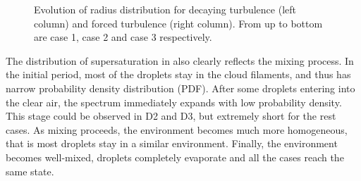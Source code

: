 \begin{figure}[H]\ContinuedFloat\centering
{}
\caption{Evolution of radius distribution for decaying turbulence (left column)
and forced turbulence (right column). From up to bottom are case 1, case 2 and
case 3 respectively.}\label{fig:rad_distri} \end{figure}

The distribution of supersaturation in  also clearly
reflects the mixing process. In the initial period, most of the droplets stay
in the cloud filaments, and thus has narrow probability density distribution
(PDF). After some droplets entering into the clear air, the spectrum
immediately expands with low probability density. This stage could be observed
in D2 and D3, but extremely short for the rest cases. As mixing proceeds, the
environment becomes much more homogeneous, that is most droplets stay in a
similar environment. Finally, the environment becomes well-mixed, droplets
completely evaporate and all the cases reach the same state.

